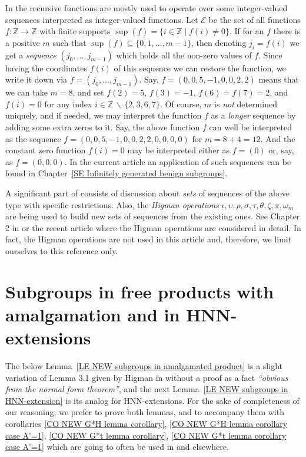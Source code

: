 \documentclass[12pt, a4paper]{amsart}
\newcommand{\Z}{{\mathbb Z}}
\newcommand{\1}{\{1\}}
\theoremstyle{plain}
\theoremstyle{definition}
\theoremstyle{remark}
\numberwithin{equation}{section}
\begin{document}
In \cite{Higman Subgroups of fP groups} the recursive functions are mostly used to operate over some integer-valued sequences interpreted as integer-valued functions.  
%
Let $\mathcal E$ be the set of all functions $f : \Z \to \Z$ with finite supports $\sup (f)=\big\{i\in \Z \mathrel{|} f(i)\neq 0\big\}$.
%
If for an $f$ there is a positive $m$ such that 
$\sup (f) \subseteq \{0,1,\ldots, m-1\}$, then 
denoting  $j_i = f(i)$ we get a \textit{sequence} $(j_0,\ldots,j_{m-1})$ which holds all the non-zero values of $f$. Since having the coordinates $f(i)$ of this sequence we can restore the function, we write it down via 
$f=(j_0,\ldots,j_{m-1})$.
%
Say,
$f=(0,0,5,-1,0,0,2,2)$
means that we can take $m=8$, and set
$f(2)=5$, $f(3)=-1$, 
$f(6)=f(7)=2$, and 
$f(i)=0$ for any index $i \in \Z \,{\backslash}\, \big\{2,3,6,7\big\}$.
%
Of course, $m$ is \textit{not} determined uniquely, and if needed, we may interpret the function $f$ as a \textit{longer} sequence by adding some extra zeros to it. Say, the above function $f$ can well be interpreted as the sequence $f=(0,0,5,-1,0,0,2,2,0,0,0,0)$ for $m=8+4=12$.
%
And the constant zero function $f(i)=0$ may be interpreted either as $f=(0)$ or, say, as $f=(0,0,0)$.
%
In the current article an application of such sequences can be found in Chapter~\ref{SE Infinitely generated benign subgroups}.

A significant part of \cite{Higman Subgroups of fP groups} consists of discussion about \textit{sets} of sequences of the above type with specific restrictions. Also, the \textit{Higman operations} $\iota, \upsilon, 
\rho,  \sigma, \tau, \theta, \zeta, \pi, \omega_m$ are being used to build new sets of sequences from the existing ones. See Chapter 2 in \cite{Higman Subgroups of fP groups} or the recent article \cite{The Higman operations and  embeddings} where the Higman operations are considered in detail. 
%
In fact, the Higman operations  are not used in this article and, therefore, we limit ourselves to this reference only.




\section{Subgroups in free products with amalgamation and in HNN-extensions}
\label{SE Subgroups in free products with amalgamation and in HNN-extensions}

\noindent
The below Lemma~\ref{LE NEW subgroups in amalgamated product} 
is a slight variation of Lemma 3.1 given by Higman in \cite{Higman Subgroups of fP groups} without a proof as a fact \textit{``obvious from the normal form theorem''}, and the next 
Lemma~\ref{LE NEW subgroups in HNN-extension}
is its analog for HNN-extensions. 
For the sake of completeness of our reasoning, we prefer to prove both lemmas, and to accompany them with corollaries
\ref{CO NEW G*H lemma corollary}, 
\ref{CO NEW G*H lemma corollary case A'=1},
\ref{CO NEW G*t lemma corollary},
\ref{CO NEW G*t lemma corollary case A'=1} 
which are going to often be used in \cite{A modified proof for Higman, 
On explicit embeddings of Q,
An explicit algorithm} 
and elsewhere.
\end{document}
